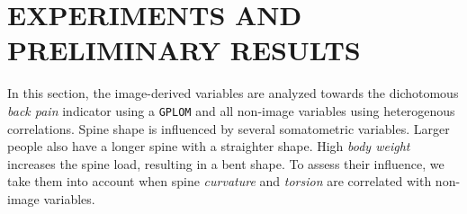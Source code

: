 \documentclass[a4paper,twoside]{style/article}
\begin{document}
\section{\uppercase{Experiments and Preliminary Results}}
\label{sec:Experiments}
\noindent In this section, the image-derived variables are analyzed towards the dichotomous \emph{back pain} indicator using a \texttt{GPLOM} and all non-image variables using heterogenous correlations.
Spine shape is influenced by several somatometric variables.
Larger people also have a longer spine with a straighter shape.
High \emph{body weight} increases the spine load, resulting in a bent shape.
To assess their influence, we take them into account when spine \emph{curvature} and \emph{torsion} are correlated with non-image variables.
\end{document}
